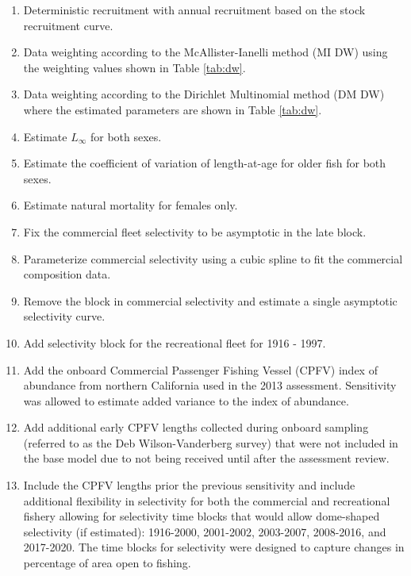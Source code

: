 \documentclass[11pt,
  english,
  a4paper,
]{article}
\begin{document}
\begin{enumerate}
   
  \item Deterministic recruitment with annual recruitment based on the stock recruitment curve. 

  \item Data weighting according to the McAllister-Ianelli method (MI DW) using the weighting values shown in Table \ref{tab:dw}. 
  
  \item Data weighting according to the Dirichlet Multinomial method (DM DW) where the estimated parameters are shown in Table \ref{tab:dw}. 

  \item Estimate $L_{\infty}$ for both sexes.

  \item Estimate the coefficient of variation of length-at-age for older fish for both sexes.

  \item Estimate natural mortality for females only.

  \item Fix the commercial fleet selectivity to be asymptotic in the late block.

  \item Parameterize commercial selectivity using a cubic spline to fit the commercial composition data. 

  \item Remove the block in commercial selectivity and estimate a single asymptotic selectivity curve. 

  \item Add selectivity block for the recreational fleet for 1916 - 1997.

  \item Add the onboard Commercial Passenger Fishing Vessel (CPFV) index of abundance from northern California used in the 2013 assessment. Sensitivity was allowed to estimate added variance to the index of abundance.

  \item Add additional early CPFV lengths collected during onboard sampling (referred to as the Deb Wilson-Vanderberg survey) that were not included in the base model due to not being received until after the assessment review.

  \item Include the CPFV lengths prior the previous sensitivity and include additional flexibility in selectivity for both the commercial and recreational fishery allowing for selectivity time blocks that would allow dome-shaped selectivity (if estimated): 1916-2000, 2001-2002, 2003-2007, 2008-2016, and 2017-2020. The time blocks for selectivity were designed to capture changes in percentage of area open to fishing.  

\end{enumerate}
\end{document}
